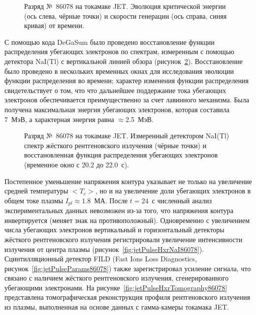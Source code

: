 \begin{figure}[ht!]
  \caption{ Разряд №~86078 на токамаке JET. Эволюция критической энергии (ось слева, чёрные точки) и скорости генерации (ось справа, синяя кривая) от времени.~\cite{Plyusnin2015} }
  \label{fig:jetPulseCriticalEnergy86078}
\end{figure}

С помощью кода DeGaSum было проведено восстановление функции распределения убегающих электронов по спектрам, измеренным с помощью детектора NaI(Tl) с вертикальной линией обзора (рисунок~\ref{fig:jetPulseEdf86078}). Восстановление было проведено в нескольких временных окнах для исследования эволюции функции распределения во времени; характер изменения функции распределения свидетельствует о том, что что дальнейшее поддержание тока убегающих электронов обеспечивается преимущественно за счет лавинного механизма. Была получена максимальная энергия убегающих электронов, которая составила 7~МэВ, а характерная энергия равна $\approx$2.5~МэВ.~\cite{Plyusnin2015}

\begin{figure}[ht!]
  \caption{ Разряд №~86078 на токамаке JET. Измеренный детектором NaI(Tl) спектр жёсткого рентгеновского излучения (чёрные точки) и восстановленная функция распределения убегающих электронов (временное окно с 20.2 до 22.0~с).~\cite{Plyusnin2015} }
  \label{fig:jetPulseEdf86078}
\end{figure}

Постепенное уменьшение напряжения контура указывает не только на увеличение средней температуры $<T_e>$, но и на увеличение доли убегающих электронов в общем токе плазмы $I_{pl} \approx 1.8$~МА. После $t = 24$~с численный анализ экспериментальных данных невозможен из-за того, что напряжения контура инвертируется (меняет знак на противоположный). Одновременно с увеличением числа убегающих электронов вертикальный и горизонтальный детекторы жёсткого рентгеновского излучения регистрировали увеличение интенсивности излучения от центра плазмы (рисунок~\ref{fig:jetPulseHxrNaI86078}). Сцинтилляционный детектор FILD (Fast Ions Loss Diagnostics, рисунок~\ref{fig:jetPulseParams86078}) также зарегистрировал усиление сигнала, что связано с наличием жёсткого рентгеновского излучения, сгенерированного убегающими электронами. На рисунке~\ref{fig:jetPulseHxrTomography86078} представлена томографическая реконструкция профиля рентгеновского излучения из плазмы, выполненная на основе данных с гамма-камеры токамака JET.~\cite{Plyusnin2015}


